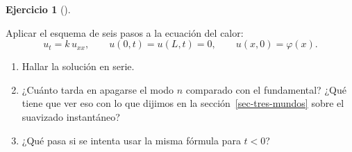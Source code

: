 \documentclass[
  spanish,
  a4paper,
]{scrbook}
\providecommand{\tightlist}{%
  \setlength{\itemsep}{0pt}\setlength{\parskip}{0pt}}
\theoremstyle{definition}
\theoremstyle{plain}
\theoremstyle{definition}
\theoremstyle{plain}
\theoremstyle{definition}
\newtheorem{exercise}{Ejercicio}[chapter]
\theoremstyle{remark}
\begin{document}
\begin{exercise}[]\protect\hypertarget{exr-calor-barra}{}\label{exr-calor-barra}

Aplicar el esquema de seis pasos a la ecuación del calor:
\[u_t = k\,u_{xx}, \qquad u(0,t)=u(L,t)=0, \qquad u(x,0)=\varphi(x).\]

\begin{enumerate}
\def\labelenumi{\alph{enumi}.}
\tightlist
\item
  Hallar la solución en serie.
\item
  ¿Cuánto tarda en apagarse el modo \(n\) comparado con el fundamental?
  ¿Qué tiene que ver eso con lo que dijimos en la
  sección~\ref{sec-tres-mundos} sobre el suavizado instantáneo?
\item
  ¿Qué pasa si se intenta usar la misma fórmula para \(t<0\)?
\end{enumerate}

\end{exercise}
\end{document}
